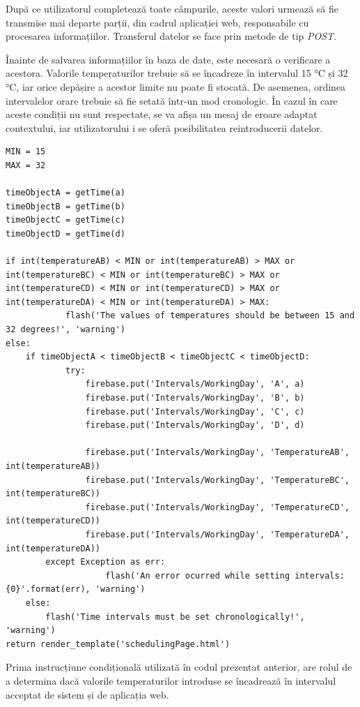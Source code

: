 	După ce utilizatorul completează toate câmpurile, aceste valori urmează să fie transmise mai departe parții, din cadrul aplicației web, responsabile cu procesarea informațiilor. Transferul datelor se face prin metode de tip \textit{POST}.

	Înainte de salvarea informațiilor în baza de date, este necesară o verificare a acestora. Valorile temperaturilor trebuie să se încadreze în intervalul 15 °C și 32 °C, iar orice depășire a acestor limite nu poate fi stocată. De asemenea, ordinea intervalelor orare trebuie să fie setată într-un mod cronologic. În cazul în care aceste condiții nu sunt respectate, se va afișa un mesaj de eroare adaptat contextului, iar utilizatorului i se oferă posibilitatea reintroducerii datelor.


\vspace{1em}
\begin{lstlisting}
MIN = 15
MAX = 32

timeObjectA = getTime(a)
timeObjectB = getTime(b)
timeObjectC = getTime(c)
timeObjectD = getTime(d)

if int(temperatureAB) < MIN or int(temperatureAB) > MAX or int(temperatureBC) < MIN or int(temperatureBC) > MAX or     			int(temperatureCD) < MIN or int(temperatureCD) > MAX or int(temperatureDA) < MIN or int(temperatureDA) > MAX:
            flash('The values of temperatures should be between 15 and 32 degrees!', 'warning')
else:
	if timeObjectA < timeObjectB < timeObjectC < timeObjectD:
      		try:
              	firebase.put('Intervals/WorkingDay', 'A', a)
              	firebase.put('Intervals/WorkingDay', 'B', b)
              	firebase.put('Intervals/WorkingDay', 'C', c)
              	firebase.put('Intervals/WorkingDay', 'D', d)

              	firebase.put('Intervals/WorkingDay', 'TemperatureAB', int(temperatureAB))
              	firebase.put('Intervals/WorkingDay', 'TemperatureBC', int(temperatureBC))
              	firebase.put('Intervals/WorkingDay', 'TemperatureCD', int(temperatureCD))
              	firebase.put('Intervals/WorkingDay', 'TemperatureDA', int(temperatureDA))
       	except Exception as err:
                	flash('An error ocurred while setting intervals: {0}'.format(err), 'warning')
	else:
		flash('Time intervals must be set chronologically!', 'warning')
return render_template('schedulingPage.html')
\end{lstlisting}
\vspace{2em} 

	Prima instrucțiune condițională utilizată în codul prezentat anterior, are rolul de a determina dacă valorile temperaturilor introduse se încadrează în intervalul acceptat de sistem și de aplicația web.  


